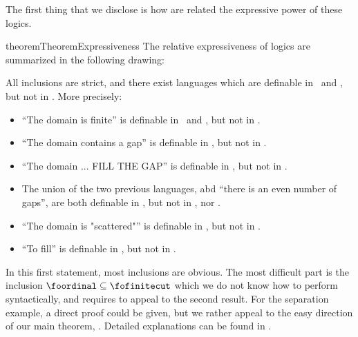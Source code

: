 The first thing that we disclose is how are related the expressive power of these logics.
\begin{restatable}{theorem}{TheoremExpressiveness}
	The relative expressiveness of logics are summarized in the following drawing:
	\begin{center}
	\end{center}
	All inclusions are strict, and there exist languages which are definable in \focut\ and \fofinite, but not in \fo.
	More precisely:
	\begin{itemize}
	\item ``The domain is finite'' is definable in \focut\ and \fofinite, but not in \fo.
	\item ``The domain contains a gap'' is definable in \focut, but not in \fofinite.
	\item ``The domain ... FILL THE GAP'' is definable in \fofinite, but not in \focut.
	\item The union of the two previous languages, abd ``there is an even number of gaps'',
			are both definable in \fofinitecut, but not in \fofinite, nor \focut.
	\item ``The domain is "scattered"'' is definable in \foscattered, but not in \fofinitecut.
	\item ``To fill'' is definable in \mso, but not in \foscattered.
 	\end{itemize}
\end{restatable}
In this first statement, most inclusions are obvious. The most difficult part is the inclusion $\foordinal\subseteq\fofinitecut$ which we do not know how to perform syntactically, and requires to appeal to the second result. For the separation example, a direct proof could be given, but we rather appeal to the easy direction of our main theorem, . 
Detailed explanations can be found in .

